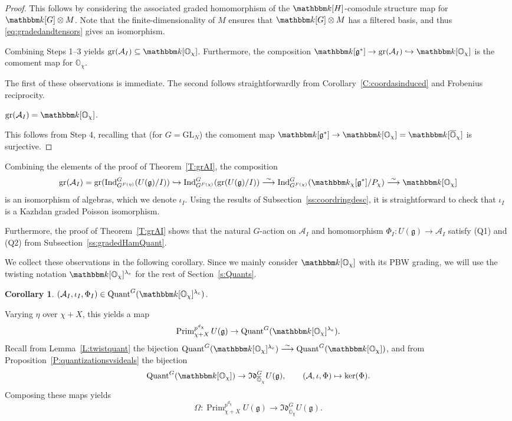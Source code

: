 \documentclass[twoside,12pt,reqno]{amsart}
\newtheorem{Corollary}[Theorem]{Corollary}
\theoremstyle{remark}
\numberwithin{equation}{section}
\def\isoto{\overset{\sim}{\longrightarrow}}
\def\k{{\mathbbm k}}
\def\gr{\operatorname{gr}}
\def\Quant{\operatorname{Quant}}
\def\Ind{\operatorname{Ind}}
\def\Prim{\operatorname{Prim}}
\def\o{\overline}
\def\O{{\mathbb O}}
\def\GL{\mathrm{GL}}
\def\g{{\mathfrak g}}
\def\Idl{\mathfrak{Id}}
\def\cA{\mathcal{A}}
\newcommand{\A}{\mathcal{A}}
\begin{document}
\begin{proof}
    This follows by considering the associated graded homomorphism of the $\k[H]$-comodule structure map for $\k[G]\otimes M$. Note that the finite-dimensionality of $M$ ensures that $\k[G]\otimes M$ has a filtered basis, and thus \eqref{eq:gradedandtensors} gives an isomorphism.
    
    Combining Steps 1--3 yields $\gr(\cA_I)\subseteq \k[\O_\chi]$. Furthermore, the composition $\k[\g^*]\to\gr(\cA_I)\hookrightarrow \k[\O_\chi]$ is the comoment map for $\O_\chi$.

    The first of these observations is immediate. The second follows straightforwardly from Corollary~\ref{C:coordasinduced} and Frobenius reciprocity.

    $\gr(\cA_I)=\k[\O_\chi]$.

    This follows from Step 4, recalling that (for $G=\GL_N$) the comoment map $\k[\g^*]\to \k[\O_\chi]=\k[\o{\O}_\chi]$ is surjective.
\end{proof}

Combining the elements of the proof of Theorem~\ref{T:grAI}, the composition $$\gr(\cA_I)=\gr(\Ind_{G^{F(\eta)}}^G (U(\g)/I))\hookrightarrow \Ind_{G^{F(\chi)}}^G(\gr(U(\g)/I))\isoto \Ind_{G^{F(\chi)}}^G(\k_\chi[\g^*]/P_\chi)\isoto \k[\O_\chi]$$ is an isomorphism of algebras, which we denote $\iota_I$. Using the results of Subsection~\ref{ss:coordringdesc}, it is straightforward to check that $\iota_I$ is a Kazhdan graded Poisson isomorphism.

Furthermore, the proof of Theorem~\ref{T:grAI} shows that the natural $G$-action on $\A_I$ and homomorphism $\Phi_I:U(\g)\to \A_I$ satisfy (Q1) and (Q2) from Subsection~\ref{ss:gradedHamQuant}.

We collect these observations in the following corollary. Since we mainly consider $\k[\O_\chi]$ with its PBW grading, we will use the twisting notation $\k[\O_\chi]^{\lambda_e}$ for the rest of Section~\ref{s:Quants}.

\begin{Corollary}\label{C:AIQuant}
$(\cA_I,\iota_I,\Phi_I)\in\Quant^G(\k[\O_\chi]^{\lambda_e})$.
\end{Corollary}

Varying $\eta$ over $\chi+X$, this yields a map $$\Prim_{\chi+X}^{p^{d_\chi}} U(\g)\to \Quant^G(\k[\O_\chi]^{\lambda_e}) .$$ Recall from Lemma~\ref{L:twistquant} the bijection $\Quant^G(\k[\O_\chi]^{\lambda_e})\isoto \Quant^G(\k[\O_\chi])$, and from Proposition~\ref{P:quantizationsvsideals} the bijection $$\Quant^G(\k[\O_\chi])\to \Idl_{\o{\O}_\chi}^G U(\g), \qquad (\cA,\iota,\Phi)\mapsto \ker(\Phi).$$ Composing these maps yields $$\Omega:\Prim_{\chi+X}^{p^{d_\chi}} U(\g)\to \Idl_{\o{\O}_\chi}^G U(\g).$$
\end{document}
